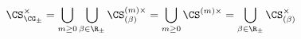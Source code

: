 \begin{equation}
\CS^\times_{\CG_\pm} = \bigcup_{m\ge 0} \bigcup_{\beta\in\R_\pm }   
	\CS^{(m)\times}_{(\beta )}= \bigcup_{m\ge 0} \CS^{(m)\times}
		= \bigcup_{\beta\in\R_\pm } \CS^\times_{(\beta)} 
\label{eq:Sbdual}
\end{equation}

